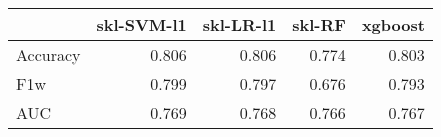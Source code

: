 \begin{tabular}{lrrrr}
\toprule
{} &  skl-SVM-l1 &  skl-LR-l1 &  skl-RF &  xgboost \\
\midrule
Accuracy &       0.806 &      0.806 &   0.774 &    0.803 \\
F1w      &       0.799 &      0.797 &   0.676 &    0.793 \\
AUC      &       0.769 &      0.768 &   0.766 &    0.767 \\
\bottomrule
\end{tabular}
